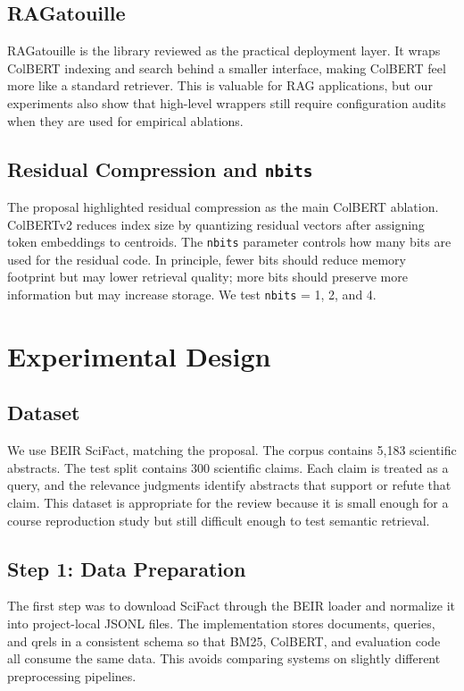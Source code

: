 \documentclass[sigconf,nonacm]{acmart}
\begin{document}
\subsection{RAGatouille}

RAGatouille is the library reviewed as the practical deployment layer. It wraps
ColBERT indexing and search behind a smaller interface, making ColBERT feel more
like a standard retriever. This is valuable for RAG applications, but our
experiments also show that high-level wrappers still require configuration
audits when they are used for empirical ablations.

\subsection{Residual Compression and \texttt{nbits}}

The proposal highlighted residual compression as the main ColBERT ablation.
ColBERTv2 reduces index size by quantizing residual vectors after assigning
token embeddings to centroids. The \texttt{nbits} parameter controls how many
bits are used for the residual code. In principle, fewer bits should reduce
memory footprint but may lower retrieval quality; more bits should preserve more
information but may increase storage. We test \texttt{nbits} = 1, 2, and 4.

\section{Experimental Design}

\subsection{Dataset}

We use BEIR SciFact, matching the proposal. The corpus contains 5,183 scientific
abstracts. The test split contains 300 scientific claims. Each claim is treated
as a query, and the relevance judgments identify abstracts that support or
refute that claim. This dataset is appropriate for the review because it is
small enough for a course reproduction study but still difficult enough to test
semantic retrieval.

\subsection{Step 1: Data Preparation}

The first step was to download SciFact through the BEIR loader and normalize it
into project-local JSONL files. The implementation stores documents, queries,
and qrels in a consistent schema so that BM25, ColBERT, and evaluation code all
consume the same data. This avoids comparing systems on slightly different
preprocessing pipelines.
\end{document}
